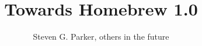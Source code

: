 \documentclass[11pt]{article}
\begin{document}
\title{Towards Homebrew 1.0}


\author{ Steven G. Parker, others in the future
      }

\maketitle


\tableofcontents

\begin{abstract}




\end{abstract}

\newpage







\end{document}
